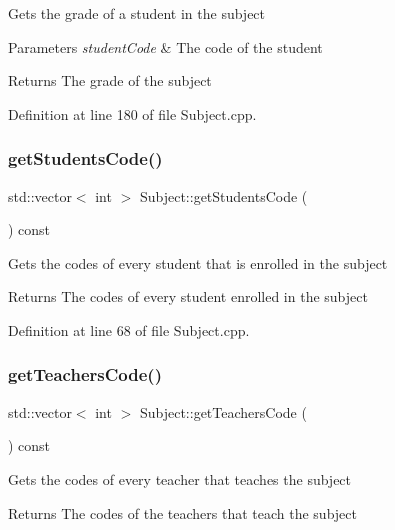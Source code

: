 Gets the grade of a student in the subject 
\begin{DoxyParams}{Parameters}
{\em student\+Code} & The code of the student \\
\hline
\end{DoxyParams}
\begin{DoxyReturn}{Returns}
The grade of the subject 
\end{DoxyReturn}


Definition at line 180 of file Subject.\+cpp.

\mbox{\label{classSubject_a668e1cc5e5b0a6422d58134fae5aae7e}} 
\subsubsection{\texorpdfstring{get\+Students\+Code()}{getStudentsCode()}}
{\footnotesize\ttfamily std\+::vector$<$ int $>$ Subject\+::get\+Students\+Code (\begin{DoxyParamCaption}{ }\end{DoxyParamCaption}) const}

Gets the codes of every student that is enrolled in the subject \begin{DoxyReturn}{Returns}
The codes of every student enrolled in the subject 
\end{DoxyReturn}


Definition at line 68 of file Subject.\+cpp.

\mbox{\label{classSubject_ab82fbd086ac1f72b52fbaa2143558eeb}} 
\subsubsection{\texorpdfstring{get\+Teachers\+Code()}{getTeachersCode()}}
{\footnotesize\ttfamily std\+::vector$<$ int $>$ Subject\+::get\+Teachers\+Code (\begin{DoxyParamCaption}{ }\end{DoxyParamCaption}) const}

Gets the codes of every teacher that teaches the subject \begin{DoxyReturn}{Returns}
The codes of the teachers that teach the subject 
\end{DoxyReturn}


